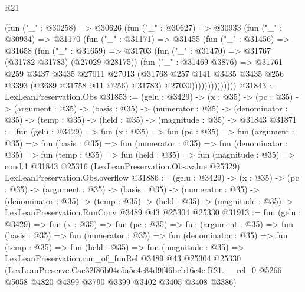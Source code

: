 \begin{lexlean}{R21}
\begin{coremodule}
                  (fun ("_" : @30258) =>
                  @30626
                    (fun ("_" : @30627) =>
                    @30933
                      (fun ("_" : @30934) =>
                      @31170
                        (fun ("_" : @31171) =>
                        @31455
                          (fun ("_" : @31456) =>
                          @31658
                            (fun ("_" : @31659) =>
                            @31703
                              (fun ("_" : @31470) => @31767 (@31782 @31783) (@27029 @28175))
                              (fun ("_" : @31469 @3876) =>
                              @31761
                                @259
                                @3437
                                @3435
                                @27011
                                @27013
                                (@31768
                                  @257
                                  @141
                                  @3435
                                  @3435
                                  @256
                                  @3393
                                  (@3689 @31758 @11 @256)
                                  @31783)
                                @27030))))))))))))))
@31843 := LexLeanPreservation.Obs
@31853 := (gelu : @3429) ->
  (x : @35) ->
  (pc : @35) ->
  (argument : @35) ->
  (basis : @35) ->
  (numerator : @35) ->
  (denominator : @35) -> (temp : @35) -> (held : @35) -> (magnitude : @35) -> @31843
@31871 := fun (gelu : @3429) =>
  fun (x : @35) =>
  fun (pc : @35) =>
  fun (argument : @35) =>
  fun (basis : @35) =>
  fun (numerator : @35) =>
  fun (denominator : @35) =>
  fun (temp : @35) =>
  fun (held : @35) =>
  fun (magnitude : @35) =>
  cond.{1} @31843 @25316 (LexLeanPreservation.Obs.value @25329) LexLeanPreservation.Obs.overflow
@31886 := (gelu : @3429) ->
  (x : @35) ->
  (pc : @35) ->
  (argument : @35) ->
  (basis : @35) ->
  (numerator : @35) ->
  (denominator : @35) ->
  (temp : @35) ->
  (held : @35) -> (magnitude : @35) -> LexLeanPreservation.RunConv @3489 @43 @25304 @25330
@31913 := fun (gelu : @3429) =>
  fun (x : @35) =>
  fun (pc : @35) =>
  fun (argument : @35) =>
  fun (basis : @35) =>
  fun (numerator : @35) =>
  fun (denominator : @35) =>
  fun (temp : @35) =>
  fun (held : @35) =>
  fun (magnitude : @35) =>
  LexLeanPreservation.run_of_funRel
    @3489
    @43
    @25304
    @25330
    (LexLeanPreserve.Cac32f86b04c5a5e4c84d9f46beb16e4c.R21.__rel_0
      @5266
      @5058
      @4820
      @4399
      @3790
      @3399
      @3402
      @3405
      @3408
      @3386)
\end{coremodule}
\end{lexlean}
